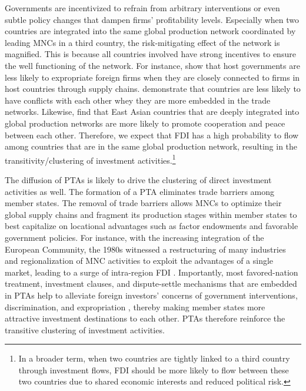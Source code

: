 \documentclass[reqno,onecolumn,letterpaper,12pt]{article}
\begin{document}
Governments are incentivized to refrain from arbitrary interventions or even subtle policy changes that dampen firms' profitability levels. Especially when two countries are integrated into the same global production network coordinated by leading MNCs in a third country, the risk-mitigating effect of the network is magnified. This is because all countries involved have strong incentives to ensure the well functioning of the network. For instance, \citet{johns2016under} show that host governments are less likely to expropriate foreign firms when they are closely connected to firms in host countries through supply chains. \citet{Dorussen_Ward:2010} demonstrate that countries are less likely to have conflicts with each other whey they are more embedded in the trade networks. Likewise, \citet{Kim_Solingen:2017} find that East Asian countries that are deeply integrated into global production networks are more likely to promote cooperation and peace between each other. Therefore, we expect that FDI has a high probability to flow among countries that are in the same global production network, resulting in the transitivity/clustering of investment activities.\footnote{In a broader term, when two countries are tightly linked to a third country through investment flows, FDI should be more likely to flow between these two countries due to shared economic interests and reduced political risk. }

The diffusion of PTAs is likely to drive the clustering of direct investment activities as well. The formation of a PTA eliminates trade barriers among member states. The removal of trade barriers allows MNCs to optimize their global supply chains and fragment its production stages within member states to best capitalize on locational advantages such as factor endowments and favorable government policies. For instance, with the increasing integration of the European Community, the 1980s witnessed a restructuring of many industries and regionalization of MNC activities to exploit the advantages of a single market, leading to a surge of intra-region FDI \citep[34]{UNCTAD:1991}. Importantly, most favored-nation treatment, investment clauses, and dispute-settle mechanisms that are embedded in PTAs help to alleviate foreign investors' concerns of government interventions, discrimination, and expropriation \citep{Buthe_Milner:2008,buthe2014foreign}, thereby making member states more attractive investment destinations to each other. PTAs therefore reinforce the transitive clustering of investment activities.
\end{document}
